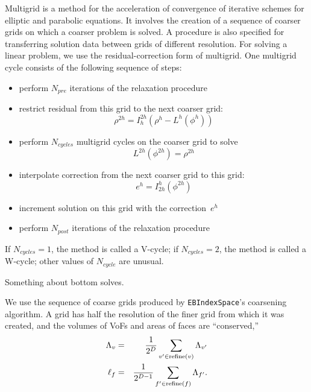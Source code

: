 Multigrid is a method for the acceleration of convergence of iterative
schemes for elliptic and parabolic equations.  It involves the
creation of a sequence of coarser grids on which a coarser problem is
solved.  A procedure is also specified for transferring solution data
between grids of different resolution.  For solving a linear problem,
we use the residual-correction form of multigrid.  One multigrid cycle
consists of the following sequence of steps:
\begin{itemize}
\item
perform $N_{pre}$ iterations of the relaxation procedure

\item
restrict residual from this grid to the next coarser grid:
\begin{equation}
\rho^{2h} = I^{2h}_h \left( \rho^h - L^h(\phi^h) \right)
\end{equation}

\item
perform $N_{cycles}$ multigrid cycles on the coarser grid to solve
\begin{equation}
L^{2h}(\phi^{2h}) = \rho^{2h}
\end{equation}

\item
interpolate correction from the next coarser grid to this grid:
\begin{equation}
e^h = I^h_{2h} \left( \phi^{2h} \right)
\end{equation}

\item
increment solution on this grid with the correction~$e^h$

\item
perform $N_{post}$ iterations of the relaxation procedure
\end{itemize}
If $N_{cycles}=1$, the method is called a V-cycle; if $N_{cycles}=2$,
the method is called a W-cycle; other values of $N_{cycle}$ are
unusual.

Something about bottom solves.

We use the sequence of coarse grids produced by \verb|EBIndexSpace|'s
coarsening algorithm.  A grid has half the resolution of the finer
grid from which it was created, and the volumes of VoFs and areas of
faces are ``conserved,''  
\begin{eqnarray}
\Lambda_v &=& \displaystyle
\frac{1}{2^D}     \sum_{v'\in\mbox{\scriptsize refine}(v)} \Lambda_{v'} 
\nonumber \\
\ell_f    &=& \displaystyle
\frac{1}{2^{D-1}} \sum_{f'\in\mbox{\scriptsize refine}(f)} \Lambda_{f'} 
.
\end{eqnarray}

